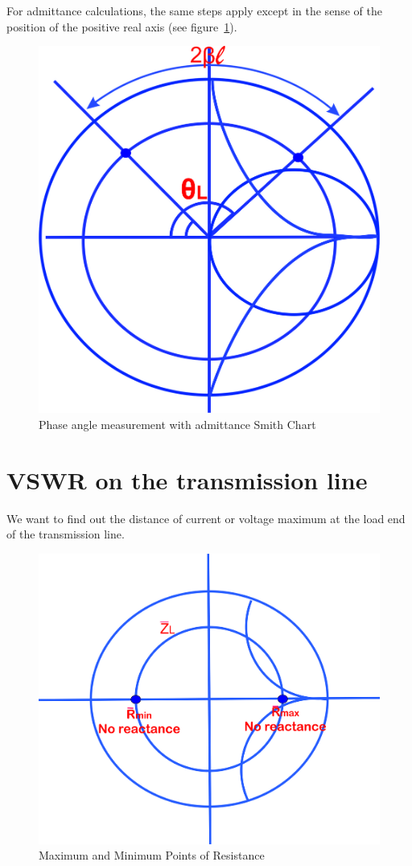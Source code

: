 For admittance calculations, the same steps apply except in the sense of the position of the positive real axis (see figure~\ref{fig:dfyui}).
\begin{figure}[h]
\centering
\includegraphics[width=0.7\linewidth]{./graphics/dfyui}
\caption{Phase angle measurement with admittance Smith Chart}
\label{fig:dfyui}
\end{figure}


\section{VSWR on the transmission line}

We want to find out the distance of current or voltage maximum at the load end of the transmission line.
\begin{figure}[h]
\centering
\includegraphics[width=0.7\linewidth]{./graphics/oijhgfdsa}
\caption{Maximum and Minimum Points of Resistance}
\label{fig:oijhgfdsa}
\end{figure}

